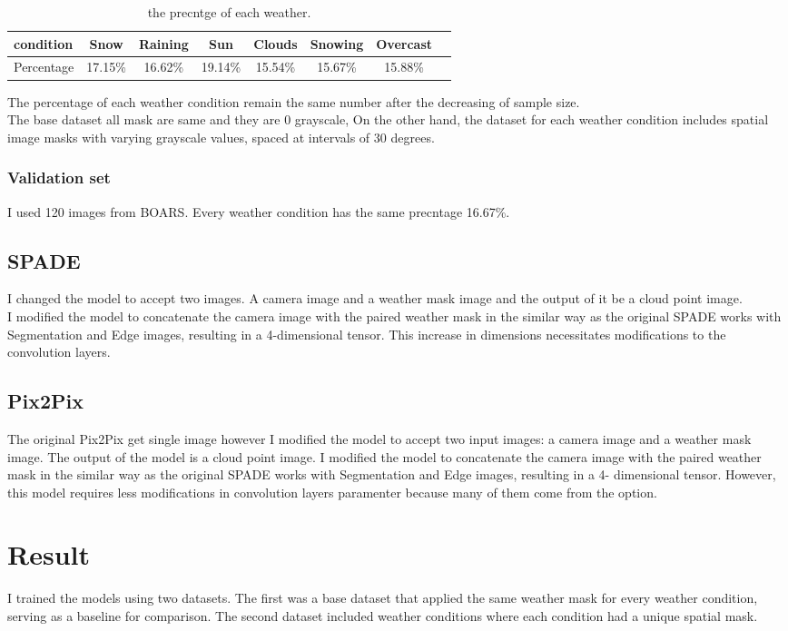 \begin{table}[h]
    \centering
    \begin{tabular}{|l|c|c|c|c|c|c|c|}
        \hline
        condition  & Snow    & Raining & Sun     & Clouds  & Snowing & Overcast \\
        \hline
        Percentage & 17.15\% & 16.62\% & 19.14\% & 15.54\% & 15.67\% & 15.88\%  \\
        \hline
    \end{tabular}
    \caption{the precntge of each weather.}
\end{table}
The percentage of each weather condition remain the same number after the decreasing of sample size.
\\
The base dataset all mask are same and they are 0 grayscale, On the other hand, the dataset for each weather condition includes spatial image masks with varying grayscale values, spaced at intervals of 30 degrees. 
\subsubsection{Validation set}
I used 120 images from BOARS. Every weather condition has the same precntage 16.67\%.
\subsection{SPADE}
I changed the model to accept two images. A camera image and a weather mask image and the output of it be a cloud point image.
\\
I modified the model to concatenate the camera image with the paired weather mask in the similar way as the original SPADE works with Segmentation and Edge images, resulting in a 4-dimensional tensor.
This increase in dimensions necessitates modifications to the convolution layers.
\subsection{Pix2Pix}
The original Pix2Pix get single image however I modified the model to accept two input images: a camera image and a weather mask image. The output of the model is a cloud point image.
I modified the model to concatenate the camera image with the paired weather mask in the
similar way as the original SPADE works with Segmentation and Edge images, resulting in a 4-
dimensional tensor. However, this model requires less modifications in convolution layers paramenter because many of them come from the option.

\section{Result}
I trained the models using two datasets. The first was a base dataset that applied the same weather mask for every weather condition, serving as a baseline for comparison. The second dataset included weather conditions where each condition had a unique spatial mask.

